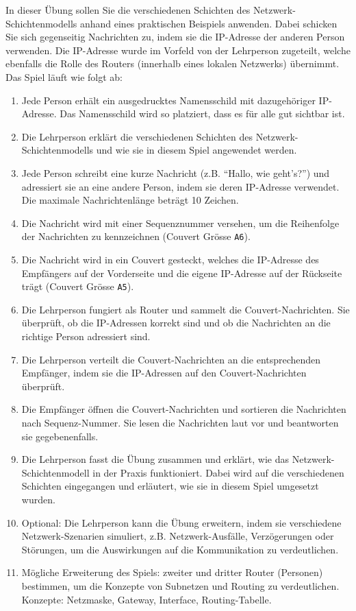 In dieser Übung sollen Sie die verschiedenen Schichten des Netzwerk-Schichtenmodells anhand eines praktischen Beispiels anwenden. Dabei schicken Sie sich gegenseitig Nachrichten zu, indem sie die IP-Adresse der anderen Person verwenden. Die IP-Adresse wurde im Vorfeld von der Lehrperson zugeteilt, welche ebenfalls die Rolle des Routers (innerhalb eines lokalen Netzwerks) übernimmt. Das Spiel läuft wie folgt ab:

\begin{enumerate}
	\item Jede Person erhält ein ausgedrucktes Namensschild mit dazugehöriger IP-Adresse. Das Namensschild wird so platziert, dass es für alle gut sichtbar ist.
	\item Die Lehrperson erklärt die verschiedenen Schichten des Netzwerk-Schichtenmodells und wie sie in diesem Spiel angewendet werden.
	\item Jede Person schreibt eine kurze Nachricht (z.B. ``Hallo, wie geht's?'') und adressiert sie an eine andere Person, indem sie deren IP-Adresse verwendet. Die maximale Nachrichtenlänge beträgt 10 Zeichen.
	\item Die Nachricht wird mit einer Sequenznummer versehen, um die Reihenfolge der Nachrichten zu kennzeichnen (Couvert Grösse \texttt{A6}).
	\item  Die Nachricht wird in ein Couvert gesteckt, welches die IP-Adresse des Empfängers auf der Vorderseite und die eigene IP-Adresse auf der Rückseite trägt (Couvert Grösse \texttt{A5}).
	\item Die Lehrperson fungiert als Router und sammelt die Couvert-Nachrichten. Sie überprüft, ob die IP-Adressen korrekt sind und ob die Nachrichten an die richtige Person adressiert sind.
	\item Die Lehrperson verteilt die Couvert-Nachrichten an die entsprechenden Empfänger, indem sie die IP-Adressen auf den Couvert-Nachrichten überprüft.
	\item Die Empfänger öffnen die Couvert-Nachrichten und sortieren die Nachrichten nach Sequenz-Nummer. Sie lesen die Nachrichten laut vor und beantworten sie gegebenenfalls.
	\item Die Lehrperson fasst die Übung zusammen und erklärt, wie das Netzwerk-Schichtenmodell in der Praxis funktioniert. Dabei wird auf die verschiedenen Schichten eingegangen und erläutert, wie sie in diesem Spiel umgesetzt wurden.
	\item Optional: Die Lehrperson kann die Übung erweitern, indem sie verschiedene Netzwerk-Szenarien simuliert, z.B. Netzwerk-Ausfälle, Verzögerungen oder Störungen, um die Auswirkungen auf die Kommunikation zu verdeutlichen.
	\item Mögliche Erweiterung des Spiels: zweiter und dritter Router (Personen) bestimmen, um die Konzepte von Subnetzen und Routing zu verdeutlichen. Konzepte: Netzmaske, Gateway, Interface, Routing-Tabelle.
\end{enumerate}

